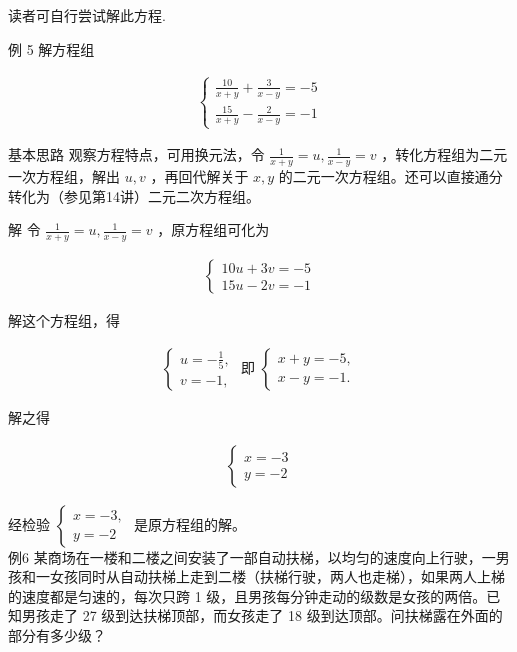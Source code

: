 \documentclass[10pt]{article}
\begin{document}
读者可自行尝试解此方程.

例 5 解方程组

\begin{align*}
\left\{\begin{array}{l}
\frac{10}{x+y}+\frac{3}{x-y}=-5 \\
\frac{15}{x+y}-\frac{2}{x-y}=-1
\end{array}\right.
\end{align*}

基本思路 观察方程特点，可用换元法，令 $\frac{1}{x+y}=u, \frac{1}{x-y}=v$ ，转化方程组为二元一次方程组，解出 $u, v$ ，再回代解关于 $x, y$ 的二元一次方程组。还可以直接通分转化为（参见第14讲）二元二次方程组。

解 令 $\frac{1}{x+y}=u, \frac{1}{x-y}=v$ ，原方程组可化为

\begin{align*}
\left\{\begin{array}{l}
10 u+3 v=-5 \\
15 u-2 v=-1
\end{array}\right.
\end{align*}

解这个方程组，得

\begin{align*}
\left\{\begin{array} { l } 
{ u = - \frac { 1 } { 5 } , } \\
{ v = - 1 , }
\end{array} \text { 即 } \left\{\begin{array}{l}
x+y=-5, \\
x-y=-1 .
\end{array}\right.\right.
\end{align*}

解之得

\begin{align*}
\left\{\begin{array}{l}
x=-3 \\
y=-2
\end{array}\right.
\end{align*}

经检验 $\left\{\begin{array}{l}x=-3, \\ y=-2\end{array}\right.$ 是原方程组的解。\\
例6 某商场在一楼和二楼之间安装了一部自动扶梯，以均匀的速度向上行驶，一男孩和一女孩同时从自动扶梯上走到二楼（扶梯行驶，两人也走梯），如果两人上梯的速度都是匀速的，每次只跨 1 级，且男孩每分钟走动的级数是女孩的两倍。已知男孩走了 27 级到达扶梯顶部，而女孩走了 18 级到达顶部。问扶梯露在外面的部分有多少级？
\end{document}
